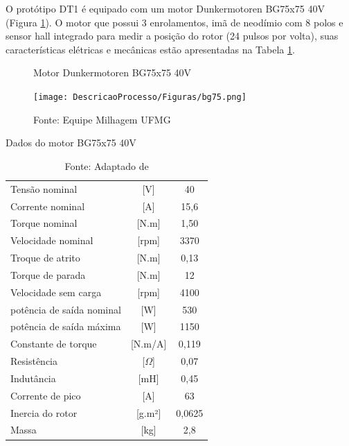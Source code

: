 O protótipo DT1 é equipado com um motor Dunkermotoren BG75x75 40V (Figura \ref{fig:motor_bg75}). O motor que possui 3 enrolamentos, imã de neodímio
com 8 polos e sensor hall integrado para medir a posição do rotor (24 pulsos por volta), suas características elétricas e mecânicas estão
apresentadas na Tabela \ref{tab:dadosBg75}.

\begin{figure}[h]
	\centering
	\caption{Motor Dunkermotoren BG75x75 40V}
	\label{fig:motor_bg75}
	\texttt{[image: DescricaoProcesso/Figuras/bg75.png]}
	\caption*{\footnotesize Fonte: Equipe Milhagem UFMG}
\end{figure}

\begin{table}[H]
	\centering
	\caption{Dados do motor BG75x75 40V}
	\label{tab:dadosBg75}
	\begin{tabular}{lcc}
		\toprule
		Tensão nominal            & {[}V{]}        & 40     \\
		Corrente nominal          & {[}A{]}        & 15,6   \\
		Torque nominal            & {[}N.m{]}      & 1,50    \\
		Velocidade nominal        & {[}rpm{]}      & 3370   \\
		Troque de atrito          & {[}N.m{]}      & 0,13   \\
		Torque de parada          & {[}N.m{]}      & 12     \\
		Velocidade sem carga      & {[}rpm{]}      & 4100   \\
		potência de saída nominal & {[}W{]}        & 530    \\
		potência de saída máxima  & {[}W{]}        & 1150   \\
		Constante de torque       & {[}N.m/A{]}    & 0,119  \\
		Resistência               & {[}$\Omega${]} & 0,07   \\
		Indutância                & {[}mH{]}       & 0,45   \\
		Corrente de pico          & {[}A{]}        & 63     \\
		Inercia do rotor          & {[}g.m²{]}     & 0,0625 \\
		Massa                     & {[}kg{]}       & 2,8    \\
		\bottomrule
	\end{tabular}
	\caption*{\footnotesize Fonte: Adaptado de \cite{manual:BG75}}
\end{table}


